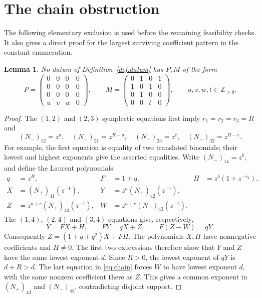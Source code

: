 \documentclass[11pt,a4paper]{article}
\newtheorem{lemma}[theorem]{Lemma}
\theoremstyle{definition}
\newcommand{\Z}{\mathbb Z}
\begin{document}
\section{The chain obstruction}\label{sec:chain}
The following elementary exclusion is used before the remaining feasibility
checks. It also gives a direct proof for the largest surviving coefficient
pattern in the constant enumeration.

\begin{lemma}\label{lem:chain}
No datum of Definition~\ref{def:datum} has $P,M$ of the form
\[
 P=\begin{pmatrix}0&0&0&0\\0&0&0&0\\0&0&0&0\\u&v&w&0\end{pmatrix},\qquad
 M=\begin{pmatrix}0&1&0&1\\1&0&1&0\\0&1&0&0\\0&0&t&0\end{pmatrix},
 \qquad u,v,w,t\in\Z_{\ge0}.
\]
\end{lemma}
\begin{proof}
The $(1,2)$ and $(2,3)$ symplectic equations first imply
$r_1=r_2=r_3=R$ and
\[
 (N_-)_{12}=z^a,\quad (N_-)_{21}=z^{R-a},\quad
 (N_-)_{23}=z^c,\quad (N_-)_{32}=z^{R-c}.
\]
For example, the first equation is equality of two translated binomials;
their lowest and highest exponents give the asserted equalities.
Write $(N_-)_{14}=z^b$, and define the Laurent polynomials
\[
 \begin{aligned}
 q&=z^R,&F&=1+q,&H&=z^b(1+z^{-r_4}),\\
 X&=(N_+)_{41}(z^{-1}),&
 Y&=z^a(N_+)_{42}(z^{-1}),\\
 Z&=z^{a+c}(N_+)_{43}(z^{-1}),&
 W&=z^{a+c}(N_-)_{43}(z^{-1}).
 \end{aligned}
\]
The $(1,4)$, $(2,4)$ and $(3,4)$ equations give, respectively,
\begin{equation}\label{eq:chain}
 Y=FX+H,\qquad FY=qX+Z,\qquad F(Z-W)=qY.
\end{equation}
Consequently $Z=(1+q+q^2)X+FH$. The polynomials $X,H$ have nonnegative
coefficients and $H\ne0$. The first two expressions therefore show that
$Y$ and $Z$ have the same lowest exponent $d$. Since $R>0$, the lowest
exponent of $qY$ is $d+R>d$. The last equation in \eqref{eq:chain} forces
$W$ to have lowest exponent $d$, with the same nonzero coefficient there
as $Z$. This gives a common exponent in $(N_+)_{43}$ and $(N_-)_{43}$,
contradicting disjoint support.
\end{proof}
\end{document}
